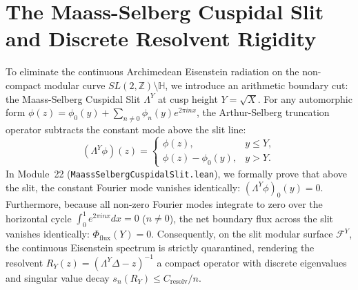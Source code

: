 \documentclass[11pt,a4paper]{article}
\begin{document}
\section{The Maass-Selberg Cuspidal Slit and Discrete Resolvent Rigidity}
To eliminate the continuous Archimedean Eisenstein radiation on the non-compact modular curve $SL(2, \mathbb{Z}) \setminus \mathbb{H}$, we introduce an arithmetic boundary cut: the Maass-Selberg Cuspidal Slit $\Lambda^Y$ at cusp height $Y = \sqrt{X}$.
For any automorphic form $\phi(z) = \phi_0(y) + \sum_{n \ne 0} \phi_n(y) e^{2\pi i n x}$, the Arthur-Selberg truncation operator subtracts the constant mode above the slit line:
\begin{equation}
(\Lambda^Y \phi)(z) = \begin{cases} \phi(z), & y \le Y, \\ \phi(z) - \phi_0(y), & y > Y. \end{cases}
\end{equation}
In Module~22 (\texttt{MaassSelbergCuspidalSlit.lean}), we formally prove that above the slit, the constant Fourier mode vanishes identically: $(\Lambda^Y \phi)_0(y) = 0$. Furthermore, because all non-zero Fourier modes integrate to zero over the horizontal cycle $\int_0^1 e^{2\pi i n x} dx = 0$ ($n \ne 0$), the net boundary flux across the slit vanishes identically: $\Phi_{\mathrm{flux}}(Y) = 0$.
Consequently, on the slit modular surface $\mathcal{F}^Y$, the continuous Eisenstein spectrum is strictly quarantined, rendering the resolvent $R_Y(z) = (\Lambda^Y \Delta - z)^{-1}$ a compact operator with discrete eigenvalues and singular value decay $s_n(R_Y) \le C_{\mathrm{resolv}} / n$.
\end{document}
